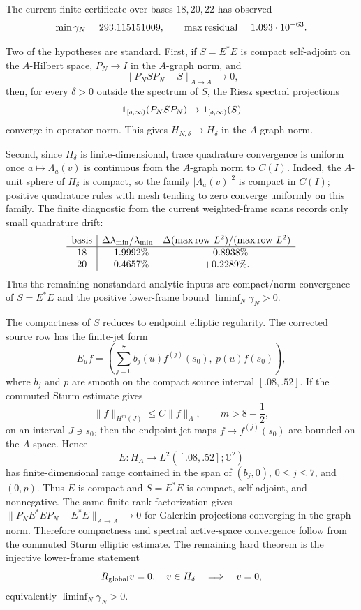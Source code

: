 \documentclass[11pt]{article}
\begin{document}
The current finite certificate over bases \(18,20,22\) has observed
\[
  \min\gamma_N=293.115151009,
  \qquad
  \max{\rm residual}=1.093\cdot10^{-63}.
\]

Two of the hypotheses are standard.  First, if \(S=E^\ast E\) is compact
self-adjoint on the \(A\)-Hilbert space, \(P_N\to I\) in the \(A\)-graph norm,
and
\[
  \|P_NSP_N-S\|_{A\to A}\to0,
\]
then, for every \(\delta>0\) outside the spectrum of \(S\), the Riesz spectral
projections
\[
  {\bf 1}_{[\delta,\infty)}(P_NSP_N)
  \to {\bf 1}_{[\delta,\infty)}(S)
\]
converge in operator norm.  This gives \(H_{N,\delta}\to H_\delta\) in the
\(A\)-graph norm.

Second, since \(H_\delta\) is finite-dimensional, trace quadrature convergence
is uniform once \(a\mapsto\Lambda_a(v)\) is continuous from the \(A\)-graph norm
to \(C(I)\).  Indeed, the \(A\)-unit sphere of \(H_\delta\) is compact, so the
family \(|\Lambda_a(v)|^2\) is compact in \(C(I)\); positive quadrature rules
with mesh tending to zero converge uniformly on this family.  The finite
diagnostic from the current weighted-frame scans records only small quadrature
drift:
\[
\begin{array}{c|cc}
{\rm basis}&\Delta\lambda_{\min}/\lambda_{\min}&
\Delta(\max{\rm row}\ L^2)/(\max{\rm row}\ L^2)\\\hline
18&-1.9992\%&+0.8938\%\\
20&-0.4657\%&+0.2289\%.
\end{array}
\]
Thus the remaining nonstandard analytic inputs are compact/norm convergence of
\(S=E^\ast E\) and the positive lower-frame bound
\(\liminf_N\gamma_N>0\).

The compactness of \(S\) reduces to endpoint elliptic regularity.  The corrected
source row has the finite-jet form
\[
  E_u f=
  \left(\sum_{j=0}^7 b_j(u)f^{(j)}(s_0),\ p(u)f(s_0)\right),
\]
where \(b_j\) and \(p\) are smooth on the compact source interval
\([.08,.52]\).  If the commuted Sturm estimate gives
\[
  \|f\|_{H^m(J)}\le C\|f\|_A,\qquad m>8+\frac12,
\]
on an interval \(J\ni s_0\), then the endpoint jet maps
\(f\mapsto f^{(j)}(s_0)\) are bounded on the \(A\)-space.  Hence
\[
  E:H_A\to L^2([.08,.52];\mathbb C^2)
\]
has finite-dimensional range contained in the span of
\((b_j,0)\), \(0\le j\le7\), and \((0,p)\).  Thus \(E\) is compact and
\(S=E^\ast E\) is compact, self-adjoint, and nonnegative.  The same finite-rank
factorization gives \(\|P_NE^\ast EP_N-E^\ast E\|_{A\to A}\to0\) for Galerkin
projections converging in the graph norm.  Therefore compactness and spectral
active-space convergence follow from the commuted Sturm elliptic estimate.  The
remaining hard theorem is the injective lower-frame statement
\[
  R_{\rm global}v=0,\quad v\in H_\delta \quad\Longrightarrow\quad v=0,
\]
equivalently \(\liminf_N\gamma_N>0\).
\end{document}
